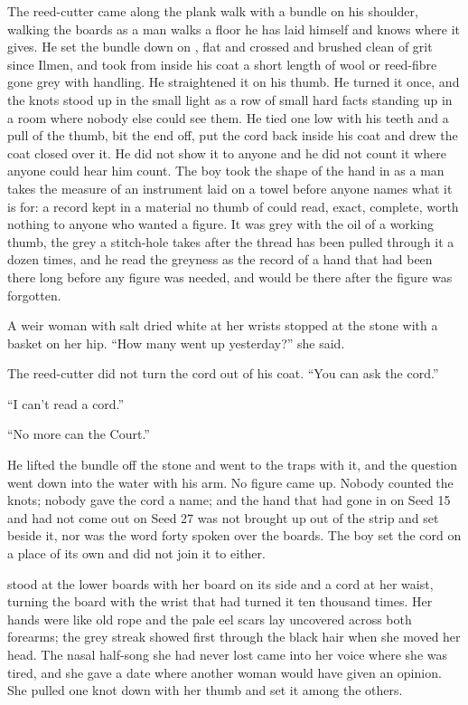 The reed-cutter came along the plank walk with a bundle on his shoulder, walking the boards as a man walks a floor he has laid himself and knows where it gives. He set the bundle down on , flat and crossed and brushed clean of grit since Ilmen, and took from inside his coat a short length of wool or reed-fibre gone grey with handling. He straightened it on his thumb. He turned it once, and the knots stood up in the small light as a row of small hard facts standing up in a room where nobody else could see them. He tied one low with his teeth and a pull of the thumb, bit the end off, put the cord back inside his coat and drew the coat closed over it. He did not show it to anyone and he did not count it where anyone could hear him count. The boy took the shape of the hand in as a man takes the measure of an instrument laid on a towel before anyone names what it is for: a record kept in a material no thumb of  could read, exact, complete, worth nothing to anyone who wanted a figure. It was grey with the oil of a working thumb, the grey a stitch-hole takes after the thread has been pulled through it a dozen times, and he read the greyness as the record of a hand that had been there long before any figure was needed, and would be there after the figure was forgotten.

A weir woman with salt dried white at her wrists stopped at the stone with a basket on her hip. “How many went up yesterday?” she said.

The reed-cutter did not turn the cord out of his coat. “You can ask the cord.”

“I can't read a cord.”

“No more can the Court.”

He lifted the bundle off the stone and went to the traps with it, and the question went down into the water with his arm. No figure came up. Nobody counted the knots; nobody gave the cord a name; and the hand that had gone in on Seed 15 and had not come out on Seed 27 was not brought up out of the strip and set beside it, nor was the word forty spoken over the boards. The boy set the cord on a place of its own and did not join it to either.

 stood at the lower boards with her board on its side and a cord at her waist, turning the board with the wrist that had turned it ten thousand times. Her hands were like old rope and the pale eel scars lay uncovered across both forearms; the grey streak showed first through the black hair when she moved her head. The nasal half-song she had never lost came into her voice where she was tired, and she gave a date where another woman would have given an opinion. She pulled one knot down with her thumb and set it among the others.

